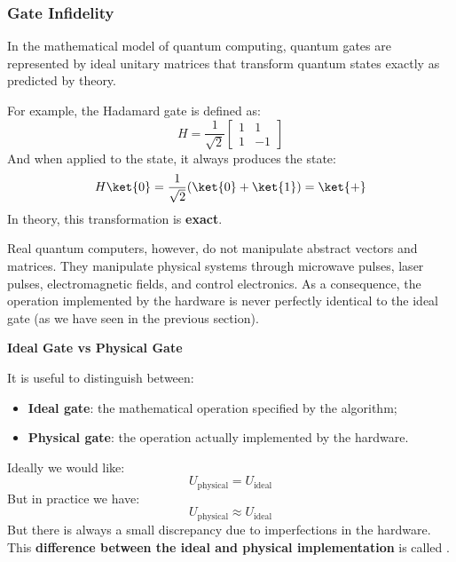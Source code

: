 \subsubsection{Gate Infidelity}\label{sec:gate-infidelity}

In the mathematical model of quantum computing, quantum gates are represented by ideal unitary matrices that transform quantum states exactly as predicted by theory.

\highspace
For example, the Hadamard gate is defined as:
\begin{equation*}
    H = \frac{1}{\sqrt{2}} \begin{bmatrix}
        1 & 1 \\
        1 & -1
    \end{bmatrix}
\end{equation*}
And when applied to the  state, it always produces the \ket{+} state:
\begin{equation*}
    H \ket{0} = \frac{1}{\sqrt{2}} (\ket{0} + \ket{1}) = \ket{+}
\end{equation*}
In theory, this transformation is \textbf{exact}.

\highspace
Real quantum computers, however, do not manipulate abstract vectors and matrices. They manipulate physical systems through microwave pulses, laser pulses, electromagnetic fields, and control electronics. As a consequence, the operation implemented by the hardware is never perfectly identical to the ideal gate (as we have seen in the previous section).

\highspace
\begin{flushleft}
    \textcolor{DarkOrange3}{ \textbf{Ideal Gate vs Physical Gate}}
\end{flushleft}
It is useful to distinguish between:
\begin{itemize}
    \item \textbf{Ideal gate}: the mathematical operation specified by the algorithm;
    \item \textbf{Physical gate}: the operation actually implemented by the hardware.
\end{itemize}
Ideally we would like:
\begin{equation*}
    U_{\text{physical}} = U_{\text{ideal}}
\end{equation*}
But in practice we have:
\begin{equation*}
    U_{\text{physical}} \approx U_{\text{ideal}}
\end{equation*}
But there is always a small discrepancy due to imperfections in the hardware. This \textbf{difference between the ideal and physical implementation} is called .